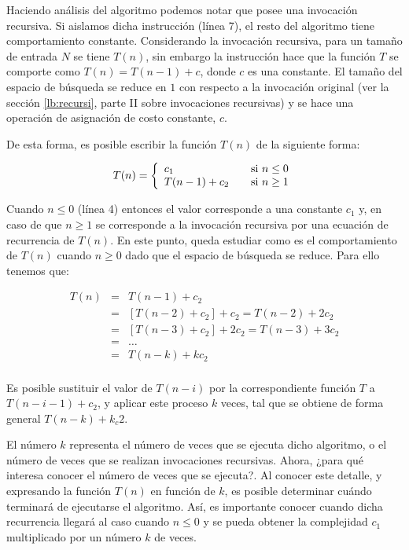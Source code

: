 Haciendo análisis del algoritmo podemos notar que posee una invocación recursiva. Si aislamos dicha instrucción (línea 7), el resto del algoritmo tiene comportamiento constante. Considerando la invocación recursiva, para un tamaño de entrada $N$ se tiene $T(n)$, sin embargo la instrucción hace que la función $T$ se comporte como $T(n) = T(n-1) + c$, donde $c$ es una constante. El tamaño del espacio de búsqueda se reduce en $1$ con respecto a la invocación original (ver la sección \ref{lb:recursi}, parte II sobre invocaciones recursivas) y se hace una operación de asignación de costo constante, $c$.

De esta forma, es posible escribir la función $T(n)$ de la siguiente forma:

\begin{equation}
T(n) = \left\{
  \begin{array}{l l}
    c_1 & \quad \text{si $n \le 0$}\\
    T(n-1) + c_2& \quad \text{si $n \ge 1$}
  \end{array} \right.
 \end{equation}
 
 Cuando $n \le 0$ (línea 4) entonces el valor corresponde a una constante $c_1$ y, en caso de que $n \ge 1$ se corresponde a la invocación recursiva por una ecuación de recurrencia de $T(n)$. En este punto, queda estudiar como es el comportamiento de $T(n)$ cuando $n \ge 0$ dado que el espacio de búsqueda se reduce. Para ello tenemos que:

\begin{eqnarray*}
T(n)&=&T(n-1) + c_2\\
&=&\left [ T(n-2) + c_2\right ] + c_2 = T(n-2) + 2c_2\\
&=&\left [ T(n-3) + c_2\right ] + 2c_2 = T(n-3) + 3c_2\\
&=&\dots\\
&=&T(n-k) + kc_2\\
\end{eqnarray*}

Es posible sustituir el valor de $T(n - i)$ por la correspondiente función $T$ a $T(n - i - 1) + c_2$, y aplicar este proceso $k$ veces, tal que se obtiene de forma general $T(n - k) + k_c2$.

El número $k$ representa el número de veces que se ejecuta dicho algoritmo, o el número de veces que se realizan invocaciones recursivas. Ahora, ¿para qué interesa conocer el número de veces que se ejecuta?. Al conocer este detalle, y expresando la función $T(n)$ en función de $k$, es posible determinar cuándo terminará de ejecutarse el algoritmo. Así, es importante conocer cuando dicha recurrencia llegará al caso cuando $n \le 0$ y se pueda obtener la complejidad $c_1$ multiplicado por un número $k$ de veces.

